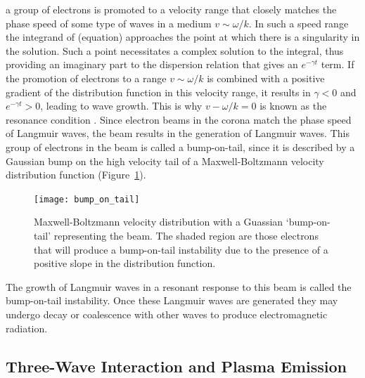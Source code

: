 a group of electrons is promoted to a velocity range that closely matches the phase speed of some type of waves in a medium $v \sim \omega/k$. In such a speed range the integrand of (equation) approaches the point at which there is a singularity in the solution. Such a point necessitates a complex solution to the integral, thus providing an imaginary part to the dispersion relation that gives an $e^{-\gamma t}$ term. If the promotion of electrons to a range $v \sim \omega/k$ is combined with a positive gradient of the distribution function in this velocity range, it results in $\gamma < 0$ and $e^{-\gamma t}>0$, leading to wave growth. This is why $v - \omega/k=0$
is known as the resonance condition \citep{melrose1989}. Since electron beams in the corona match the phase speed of Langmuir waves, the beam results in the generation of Langmuir waves. This group of electrons in the beam is called a bump-on-tail, since it is described by a Gaussian bump on the high velocity tail of a Maxwell-Boltzmann velocity distribution function (Figure~\ref{fig:bot}). 
\begin{figure}[!t] 
\begin{center}
\texttt{[image: bump\_on\_tail]}
\caption[Shock drift acceleration]{Maxwell-Boltzmann velocity distribution with a Guassian `bump-on-tail' representing the beam. The shaded region are those electrons that will produce a bump-on-tail instability due to the presence of a positive slope in the distribution function.}
\label{fig:bot}
\end{center}
\end{figure}
The growth of Langmuir waves in a resonant response to this beam is called the bump-on-tail instability. Once these Langmuir waves are generated they may undergo decay or coalescence with other waves to produce electromagnetic radiation. 



\subsection{Three-Wave Interaction and Plasma Emission}\label{sec:three_wave}

